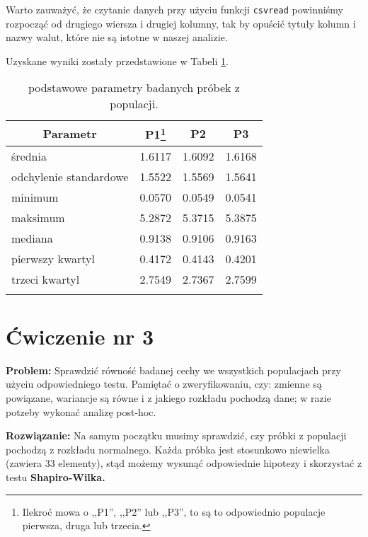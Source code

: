 \documentclass[12pt, a4paper]{article}
\begin{document}
Warto zauważyć, że czytanie danych przy użyciu funkcji \texttt{csvread} powinniśmy rozpocząć od drugiego wiersza i drugiej kolumny, tak by opuścić tytuły kolumn i nazwy walut, które nie są istotne w naszej analizie.\newline

\noindent Uzyskane wyniki zostały przedstawione w Tabeli \ref{table:c2}.

\begin{longtable}{|l|l|l|l|}\hline
  \multicolumn{1}{|c}{\bf Parametr} & \multicolumn{1}{|c}{\bf P1\footnote{\label{note:P}Ilekroć mowa o ,,P1'', ,,P2'' lub ,,P3'', to są to odpowiednio populacje pierwsza, druga lub trzecia.}} & \multicolumn{1}{|c}{\bf P2} & \multicolumn{1}{|c|}{\bf P3}\\\hline
  średnia                 & 1.6117 & 1.6092 & 1.6168\\\hline
  odchylenie standardowe  & 1.5522 & 1.5569 & 1.5641\\\hline
  minimum                 & 0.0570 & 0.0549 & 0.0541\\\hline
  maksimum                & 5.2872 & 5.3715 & 5.3875\\\hline
  mediana                 & 0.9138 & 0.9106 & 0.9163\\\hline
  pierwszy kwartyl        & 0.4172 & 0.4143 & 0.4201\\\hline
  trzeci kwartyl          & 2.7549 & 2.7367 & 2.7599\\\hline
  \caption{podstawowe parametry badanych próbek z populacji.}
  \label{table:c2}
\end{longtable}

\section*{Ćwiczenie nr 3}
\begin{hangparas}{2cm}{1}
  \textbf{Problem:} Sprawdzić równość badanej cechy we wszystkich populacjach przy użyciu odpowiedniego testu. Pamiętać o zweryfikowaniu, czy: zmienne są powiązane, wariancje są równe i z jakiego rozkładu pochodzą dane; w razie potzeby wykonać analizę post-hoc.\newline
\end{hangparas}

\begin{hangparas}{2.85cm}{1}
\textbf{Rozwiązanie:} Na samym początku musimy sprawdzić, czy próbki z populacji pochodzą z rozkładu normalnego. Każda próbka jest stosunkowo niewielka (zawiera 33 elementy), stąd możemy wysunąć odpowiednie hipotezy i skorzystać z testu \textbf{Shapiro-Wilka.}\newline
\end{hangparas}
\end{document}
